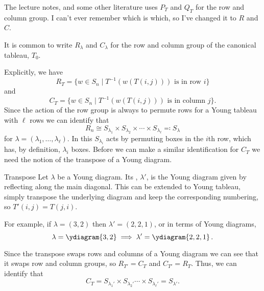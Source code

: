\documentclass[fleqn]{NotesClass}
\newcommand{\isomorphic}{\cong}
\newcommand{\rowGroup}{R}
\newcommand{\columnGroup}{C}
\begin{document}
    \begin{rmk}
        The lecture notes, and some other literature uses \(P_T\) and \(Q_T\) for the row and column group.
        I can't ever remember which is which, so I've changed it to \(\rowGroup\) and \(\columnGroup\).
    \end{rmk}
    
    It is common to write \(\rowGroup_\lambda\) and \(\columnGroup_\lambda\) for the row and column group of the canonical tableau, \(T_0\).
    
    Explicitly, we have
    \begin{equation}
        \rowGroup_T = \{w \in S_n \mid T^{-1}(w(T(i, j))) \text{ is in row } i\}
    \end{equation}
    and
    \begin{equation}
        \columnGroup_T = \{w \in S_n \mid T^{-1}(w(T(i, j))) \text{ is in column } j\}.
    \end{equation}
    Since the action of the row group is always to permute rows for a Young tableau with \(\ell\) rows we can identify that
    \begin{equation}
        \rowGroup_n \isomorphic S_{\lambda_1} \times S_{\lambda_2} \times \dotsb \times S_{\lambda_\ell} \eqcolon S_\lambda
    \end{equation}
    for \(\lambda = (\lambda_1, \dotsc, \lambda_\ell)\).
    In this \(S_{\lambda_i}\) acts by permuting boxes in the \(i\)th row, which has, by definition, \(\lambda_i\) boxes.
    Before we can make a similar identification for \(\columnGroup_T\) we need the notion of the transpose of a Young diagram.
    
    \begin{dfn}{Transpose}{}
        Let \(\lambda\) be a Young diagram.
        Its , \(\lambda'\), is the Young diagram given by reflecting along the main diagonal.
        This can be extended to Young tableau, simply transpose the underlying diagram and keep the corresponding numbering, so \(T'(i, j) = T(j, i)\).
    \end{dfn}
    
    For example, if \(\lambda = (3, 2)\) then \(\lambda' = (2, 2, 1)\), or in terms of Young diagrams,
    \begin{equation}
        \lambda = \ydiagram{3,2} \implies \lambda' = \ydiagram{2,2,1}\,.
    \end{equation}
    
    Since the transpose swaps rows and columns of a Young diagram we can see that it swaps row and column groups, so \(\rowGroup_{T'} = \columnGroup_T\) and \(\columnGroup_{T'} = \rowGroup_T\).
    Thus, we can identify that
    \begin{equation}
        \columnGroup_T = S_{\lambda_1'} \times S_{\lambda_2'} \dotsb \times S_{\lambda_{\ell}'} = S_{\lambda'}.
    \end{equation}
    
\end{document}
